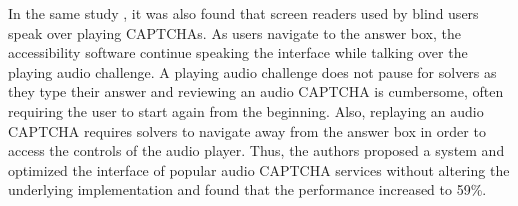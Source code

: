 In the same study \cite{bigham2009evaluating}, it was also found that screen readers used by blind users speak over
playing CAPTCHAs. As users navigate to the answer box, the accessibility software continue speaking the interface while
talking over the playing audio challenge. A playing audio challenge does not pause for solvers as they type their answer
and reviewing an audio CAPTCHA is cumbersome, often requiring the user to start again from the beginning. Also, replaying
an audio CAPTCHA requires solvers to navigate away from the answer box in order to access the controls of the audio player.
Thus, the authors proposed a system and optimized the interface of popular audio CAPTCHA services without altering the
underlying implementation and found that the performance increased to 59\%. 
